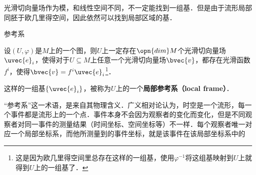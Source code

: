 光滑切向量场作为模，和线性空间不同，不一定能找到一组基．但是由于流形局部同胚于欧几里得空间，因此依然可以找到局部区域的基．


\begin{definition}{参考系}

设$(U, \varphi)$是$M$上的一个图，则$U$上一定存在$\opn{dim}M$个光滑切向量场$\uvec{e}_i$，使得对于$U\subseteq M$上任意一个光滑切向量场$\bvec{v}$，都存在光滑函数$f^i$，使得$\bvec{v}=f^i\uvec{e}_i$\footnote{这是因为欧几里得空间里总存在这样的一组基，使用$\varphi^{-1}$将这组基映射到$U$上就得到$U$上的一组基了．}．

这样的一组基$\{\uvec{e}_i\}$，被称为$U$上的一个\textbf{局部参考系（local frame）}．

\end{definition}

“参考系”这一术语，是来自其物理含义．广义相对论认为，时空是一个流形，每一个事件都是流形上的一个点．事件本身不会因为观察者的变化而变化，但是不同观察者对同一事件的测量结果（时间坐标、空间坐标等）不一样．每个观察者唯一对应一个局部坐标系，而他所测量到的事件坐标，就是该事件在该局部坐标系中的











